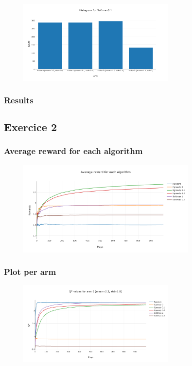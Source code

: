 \documentclass[11pt]{article}
\begin{document}
\begin{figure}[H]
   \centering
   \includegraphics[width=0.7\textwidth]{img/1-1/h6.png}
\end{figure}


\subsubsection{Results}

\subsection{Exercice 2}


\subsubsection{Average reward for each algorithm}

\begin{figure}[H]
   \centering
   \includegraphics[width=0.8\textwidth]{img/1-2/reward.png}
\end{figure}

\subsubsection{Plot per arm}

\begin{figure}[H]
   \centering
   \includegraphics[width=0.7\textwidth]{img/1-2/q1.png}
\end{figure}
\end{document}
